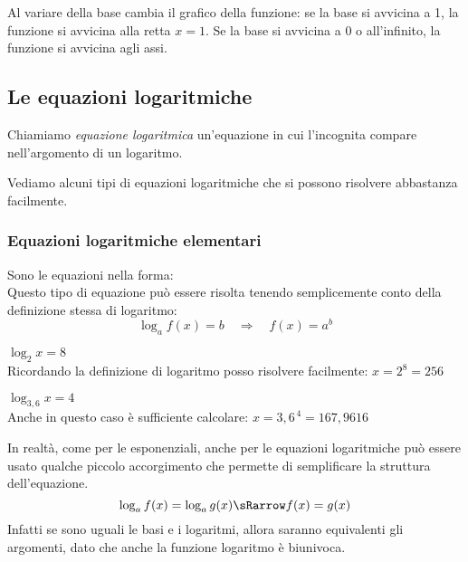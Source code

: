 \vspace{.5cm}

Al variare della base cambia il grafico della funzione: 
se la base si avvicina a 1, la funzione si avvicina 
alla retta \(x=1\). 
Se la base si avvicina a 0 o all'infinito, la funzione si avvicina agli assi.

\subsection{Le equazioni logaritmiche}
\label{subsec:esplog_equazionilogaritmiche}

\begin{definizione}{
Chiamiamo \emph{equazione logaritmica} un'equazione in cui l'incognita compare 
nell'argomento di un logaritmo.
}
\end{definizione}

Vediamo alcuni tipi di equazioni logaritmiche che si possono risolvere 
abbastanza facilmente.

\subsubsection{Equazioni logaritmiche elementari}
\label{subsubsec:esplog_eq_log_elementari}

\noindent Sono le equazioni nella forma: \quad {} \\[7pt]
Questo tipo di equazione può essere risolta tenendo semplicemente conto della definizione stessa di logaritmo:
\[\log_a{f(x)} = b \quad \Rightarrow \quad f(x)=a^b\]
\begin{esempio}
 \(\log_2{x} = 8\)\\[4pt] 
 Ricordando la definizione di logaritmo posso risolvere facilmente: \; \(x = 2^8 = 256\)
\end{esempio}
\begin{esempio}
 \(\log_{3,6}{x} = 4\)\\[4pt]
 Anche in questo caso è sufficiente calcolare: \quad \( x = 3,6^{\,4} = 167,9616\)
\end{esempio}

In realtà, come per le esponenziali, anche per le equazioni logaritmiche può essere usato qualche piccolo
accorgimento che permette di semplificare la struttura dell'equazione.
\[\log_a{f(x)} = \log_a{g(x)} \sRarrow f(x) = g(x)\]
Infatti se sono uguali le basi e i logaritmi, allora saranno equivalenti gli argomenti, 
dato che anche la funzione logaritmo è biunivoca.


